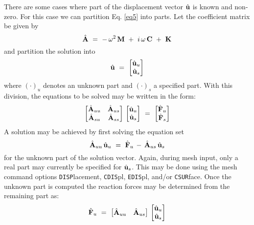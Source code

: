 There are some cases where part of the displacement vector $\hat{\mathbf{u}}$ is
known and non-zero.  For this case we can partition Eq. \ref{eq5} into
parts.  Let the coefficient matrix be given by
\begin{equation}
\label{eq6}
\hat{\mathbf{A}} ~=~ - \, \omega^2 \, \mathbf{M} ~+~ i \, \omega \, \mathbf{C} ~+~ \mathbf{K}
\end{equation}
and partition the solution into
\begin{equation}
\label{eq7}
\hat{\mathbf{u}} ~=~ \left[
\begin{matrix} \hat{\mathbf{u}}_u \\ \hat{\mathbf{u}}_s \\ \end{matrix}
\right]
\end{equation}
where $( \cdot )_u$ denotes an unknown part and $( \cdot )_s$ a specified
part.
With this division, the equations to be solved may be written in the
form:
\begin{equation}
\label{eq8}
\left[
\begin{matrix}
\hat{\mathbf{A}}_{uu} & \hat{\mathbf{A}}_{us} \\
\hat{\mathbf{A}}_{su} & \hat{\mathbf{A}}_{ss} \\
\end{matrix}
\right] \, \left[
\begin{matrix}
\hat{\mathbf{u}}_u \\ \hat{\mathbf{u}}_s \\
\end{matrix}
\right] ~=~ \left[
\begin{matrix}
\hat{\mathbf{F}}_u \\ \hat{\mathbf{F}}_s \\
\end{matrix}
\right]
\end{equation}
A solution may be achieved by first solving the equation set
\begin{equation}
\label{eq9}
\hat{\mathbf{A}}_{uu} \,  \hat{\mathbf{u}}_u ~=~
\hat{\mathbf{F}}_u \, - \,  \hat{\mathbf{A}}_{us} \, \hat{\mathbf{u}}_s
\end{equation}
for the unknown part of the solution vector.  Again, during mesh input,
only a real part may currently be specified for $\hat{\mathbf{u}}_s$.  This
may be done using the mesh command options {\tt DISP}lace\-ment,
{\tt CDIS}pl, {\tt EDIS}pl, and/or {\tt CSUR}\-face.
Once the unknown part is
computed the reaction forces may be determined from the remaining part as:
\begin{equation}
\label{eq10}
\hat{\mathbf{F}}_u ~=~
\left[
\begin{matrix}
\hat{\mathbf{A}}_{uu} & \hat{\mathbf{A}}_{us} \\
\end{matrix}
\right] \, \left[
\begin{matrix}
\hat{\mathbf{u}}_u \\ \hat{\mathbf{u}}_s \\
\end{matrix}
\right]
\end{equation}

